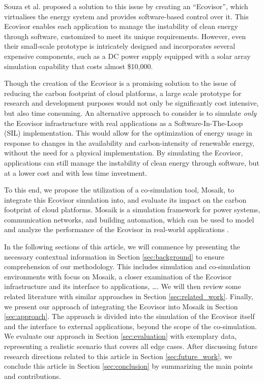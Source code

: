 Souza et al. \cite{souza2023} proposed a solution to this issue by creating an
\enquote{Ecovisor}, which virtualises the energy system and provides
software-based control over it. This Ecovisor enables each application to manage
the instability of clean energy through software, customized to meet its unique
requirements. However, even their small-scale prototype is intricately designed
and incorporates several expensive components, such as a DC power supply
equipped with a solar array simulation capability that costs almost \$10,000.

Though the creation of the Ecovisor is a promising solution to the issue of
reducing the carbon footprint of cloud platforms, a large scale prototype for
research and development purposes would not only be significantly cost
intensive, but also time consuming. An alternative approach to consider is to
simulate \emph{only} the Ecovisor infrastructure with real applications as a
Software-In-The-Loop (SIL) implementation. This would allow for the optimization
of energy usage in response to changes in the availability and carbon-intensity
of renewable energy, without the need for a physical implementation. By
simulating the Ecovisor, applications can still manage the instability of clean
energy through software, but at a lower cost and with less time investment.

To this end, we propose the utilization of a co-simulation tool, Mosaik, to
integrate this Ecovisor simulation into, and evaluate its impact on the carbon
footprint of cloud platforms. Mosaik is a simulation framework for power
systems, communication networks, and building automation, which can be used to
model and analyze the performance of the Ecovisor in real-world applications
\cite{steinbrink2019}. \medskip

In the following sections of this article, we will commence by presenting the
necessary contextual information in Section \ref{sec:background} to ensure
comprehension of our methodology. This includes simulation and co-simulation
environments with focus on Mosaik, a closer examination of the Ecovisor
infrastructure and its interface to applications, \dots. We will then review
some related literature with similar approaches in Section
\ref{sec:related_work}. Finally, we present our approach of integrating the
Ecovisor into Mosaik in Section \ref{sec:approach}. The approach is divided into
the simulation of the Ecovisor itself and the interface to external
applications, beyond the scope of the co-simulation. We evaluate our approach in
Section \ref{sec:evaluation} with exemplary data, representing a realistic
scenario that covers all edge cases. After discussing future research directions
related to this article in Section \ref{sec:future_work}, we conclude this
article in Section \ref{sec:conclusion} by summarizing the main points and
contributions.
